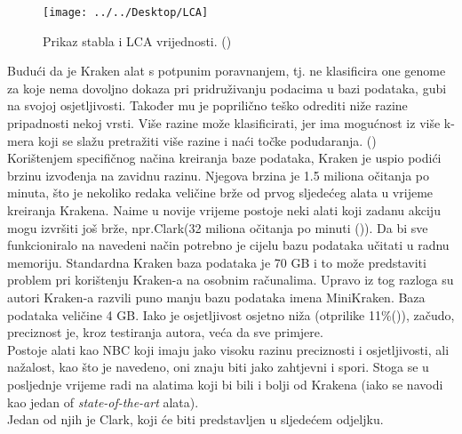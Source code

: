 \documentclass[times, utf8, seminar]{fer}
\begin{document}
\begin{figure}
	\centering
	\texttt{[image: ../../Desktop/LCA]}
	\caption{Prikaz stabla i LCA vrijednosti. (\cite{Zavrsni})}
	\label{fig:lca}
\end{figure}
Budući da je Kraken alat s potpunim poravnanjem, tj. ne klasificira one genome za koje nema dovoljno dokaza pri pridruživanju podacima u bazi podataka, gubi na svojoj osjetljivosti. Također mu je poprilično teško odrediti niže razine pripadnosti nekoj vrsti. Više razine može klasificirati, jer ima mogućnost iz više k-mera koji se slažu pretražiti više razine i naći točke podudaranja. (\cite{Kraken})
\\Korištenjem specifičnog načina kreiranja baze podataka, Kraken je uspio podići brzinu izvođenja na zavidnu razinu. Njegova brzina je 1.5 miliona očitanja po minuta, što je nekoliko redaka veličine brže od prvog sljedećeg alata u vrijeme kreiranja Krakena. Naime u novije vrijeme postoje neki alati koji zadanu akciju mogu izvršiti još brže, npr.Clark(32 miliona očitanja po minuti (\cite{CLARK})). Da bi sve funkcioniralo na navedeni način potrebno je cijelu bazu podataka učitati u radnu memoriju. Standardna Kraken baza podataka je 70 GB i to može predstaviti problem pri korištenju Kraken-a na osobnim računalima.
Upravo iz tog razloga su autori Kraken-a razvili puno manju bazu podataka imena MiniKraken. Baza podataka veličine 4 GB. Iako je osjetljivost osjetno niža (otprilike 11\%(\cite{Kraken})), začudo, preciznost je, kroz testiranja autora, veća da sve primjere.
\\Postoje alati kao NBC koji imaju jako visoku razinu preciznosti i osjetljivosti, ali nažalost, kao što je navedeno, oni znaju biti jako zahtjevni i spori. Stoga se u posljednje vrijeme radi na alatima koji bi bili i bolji od Krakena (iako se navodi kao jedan of \textit{state-of-the-art} alata).
\\Jedan od njih je Clark, koji će biti predstavljen u sljedećem odjeljku.
\end{document}
